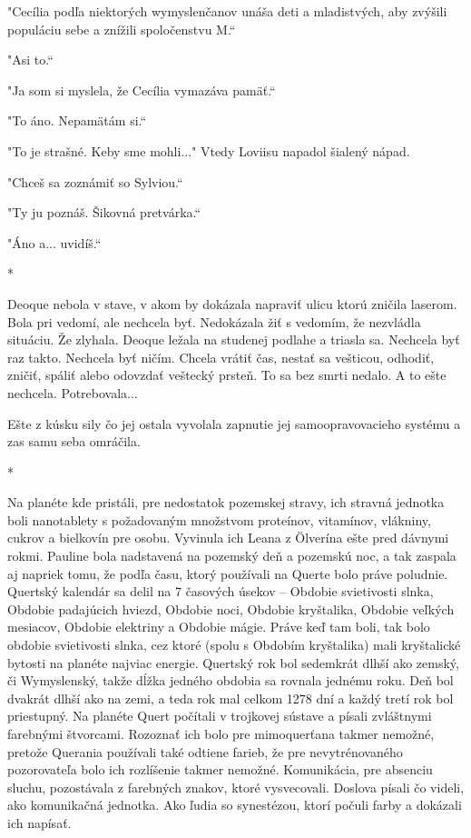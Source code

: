 \documentclass{book}
\begin{document}
"$ $Cecília podľa niektorých wymyslenčanov unáša deti a mladistvých, aby zvýšili populáciu sebe a znížili spoločenstvu M.“

"$ $Asi to.“

"$ $Ja som si myslela, že Cecília vymazáva pamäť.“

"$ $To áno. Nepamätám si.“

"$ $To je strašné. Keby sme mohli..."$ $ Vtedy Loviisu napadol šialený nápad.

"$ $Chceš sa zoznámiť so Sylviou.“

"$ $Ty ju poznáš. Šikovná pretvárka.“

"$ $Áno a... uvidíš.“

\begin{center}
*
\end{center}

Deoque nebola v stave, v akom by dokázala napraviť ulicu ktorú zničila laserom. Bola pri vedomí, ale nechcela byť. Nedokázala žiť s vedomím, že nezvládla situáciu. Že zlyhala. Deoque ležala na studenej podlahe a triasla sa. Nechcela byť raz takto. Nechcela byť ničím. Chcela vrátiť čas, nestať sa vešticou, odhodiť, zničiť, spáliť alebo odovzdať veštecký prsteň. To sa bez smrti nedalo. A to ešte nechcela. Potrebovala...

Ešte z kúsku sily čo jej ostala vyvolala zapnutie jej samoopravovacieho systému a zas samu seba omráčila.

\begin{center}
*
\end{center}

Na planéte kde pristáli, pre nedostatok pozemskej stravy, ich stravná jednotka boli nanotablety s požadovaným množstvom proteínov, vitamínov, vlákniny, cukrov a bielkovín pre osobu. Vyvinula ich Leana z Ölverína ešte pred dávnymi rokmi. Pauline bola nadstavená na pozemský deň a pozemskú noc, a tak zaspala aj napriek tomu, že podľa času, ktorý používali na Querte bolo práve poludnie. Quertský kalendár sa delil na 7 časových úsekov – Obdobie svietivosti slnka, Obdobie padajúcich hviezd, Obdobie noci, Obdobie kryštalika, Obdobie veľkých mesiacov, Obdobie elektriny a Obdobie mágie. Práve keď tam boli, tak bolo obdobie svietivosti slnka, cez ktoré (spolu s Obdobím kryštalika) mali kryštalické bytosti na planéte najviac energie. Quertský rok bol sedemkrát dlhší ako zemský, či Wymyslenský, takže dĺžka jedného obdobia sa rovnala jednému roku. Deň bol dvakrát dlhší ako na zemi, a teda rok mal celkom 1278 dní a každý tretí rok bol priestupný. Na planéte Quert počítali v trojkovej sústave a písali zvláštnymi farebnými štvorcami. Rozoznať ich bolo pre mimoquerťana takmer nemožné, pretože Querania používali také odtiene farieb, že pre nevytrénovaného pozorovateľa bolo ich rozlíšenie takmer nemožné. Komunikácia, pre absenciu sluchu, pozostávala z farebných znakov, ktoré vysvecovali. Doslova písali čo videli, ako komunikačná jednotka. Ako ľudia so synestézou, ktorí počuli farby a dokázali ich napísať.
\end{document}
